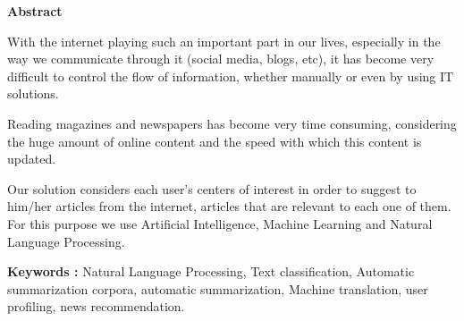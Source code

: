\begin{center}
    \Large 
    \textbf{Abstract}
\end{center}

With the internet playing such an important part in our lives, especially in the way we communicate through it (social media, blogs, etc), it has become very difficult to control the flow of information, whether manually or even by using IT solutions.

Reading magazines and newspapers has become very time consuming, considering the huge amount of online content and the speed with which this content is updated.

Our solution considers each user's centers of interest in order to suggest to him/her articles from the internet, articles that are relevant to each one of them. For this purpose we use Artificial Intelligence, Machine Learning and Natural Language Processing.

\noindent
\textbf{Keywords :} Natural Language Processing, Text classification, Automatic summarization corpora, automatic summarization, Machine translation, user profiling, news recommendation. 